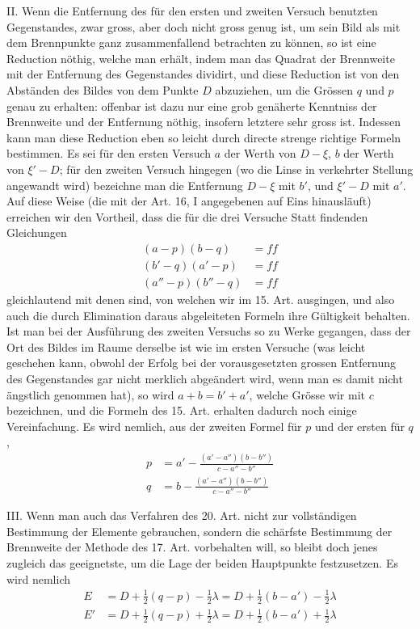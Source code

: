II. Wenn die Entfernung des für den ersten und zweiten Versuch benutzten Gegenstandes, zwar gross, aber doch nicht gross genug ist, um sein Bild als mit dem Brennpunkte ganz zusammenfallend betrachten zu können, so ist eine Reduction nöthig, welche man erhält, indem man das Quadrat der Brennweite mit der Entfernung des Gegenstandes dividirt, und diese Reduction ist von den Abständen des Bildes von dem Punkte $D$ abzuziehen, um die Grössen $q$ und $p$ genau zu erhalten: offenbar ist dazu nur eine grob genäherte Kenntniss der Brennweite und der Entfernung nöthig, insofern letztere sehr gross ist. Indessen kann man diese Reduction eben so leicht durch directe strenge richtige Formeln bestimmen. Es sei für den ersten Versuch $a$ der Werth von $D-\xi$, $b$ der Werth von $\xi'-D$; für den zweiten Versuch hingegen (wo die Linse in verkehrter Stellung angewandt wird) bezeichne man die Entfernung $D-\xi$ mit $b'$, und $\xi'-D$ mit $a'$. Auf diese Weise (die mit der Art. 16, I angegebenen auf Eins hinausläuft) erreichen wir den Vortheil, dass die für die drei Versuche Statt findenden Gleichungen
\[
\begin{aligned}
(a-p)(b-q)&=ff\\
(b'-q)(a'-p)&=ff\\
(a''-p)(b''-q)&=ff
\end{aligned}
\]
gleichlautend mit denen sind, von welchen wir im 15. Art. ausgingen, und also auch die durch Elimination daraus abgeleiteten Formeln ihre Gültigkeit behalten. Ist man bei der Ausführung des zweiten Versuchs so zu Werke gegangen, dass der Ort des Bildes im Raume derselbe ist wie im ersten Versuche (was leicht geschehen kann, obwohl der Erfolg bei der vorausgesetzten grossen Entfernung des Gegenstandes gar nicht merklich abgeändert wird, wenn man es damit nicht ängstlich genommen hat), so wird $a+b=b'+a'$, welche Grösse wir mit $c$ bezeichnen, und die Formeln des 15. Art. erhalten dadurch noch einige Vereinfachung. Es wird nemlich, aus der zweiten Formel für $p$ und der ersten für $q$,
\[
\begin{aligned}
p&=a'-\frac{(a'-a'')(b-b'')}{c-a''-b''}\\
q&=b-\frac{(a'-a'')(b-b'')}{c-a''-b''}
\end{aligned}
\]

III. Wenn man auch das Verfahren des 20. Art. nicht zur vollständigen Bestimmung der Elemente gebrauchen, sondern die schärfste Bestimmung der Brennweite der Methode des 17. Art. vorbehalten will, so bleibt doch jenes zugleich das geeignetste, um die Lage der beiden Hauptpunkte festzusetzen. Es wird nemlich
\[
\begin{aligned}
E&=D+\tfrac12(q-p)-\tfrac12\lambda=D+\tfrac12(b-a')-\tfrac12\lambda\\
E'&=D+\tfrac12(q-p)+\tfrac12\lambda=D+\tfrac12(b-a')+\tfrac12\lambda
\end{aligned}
\]

